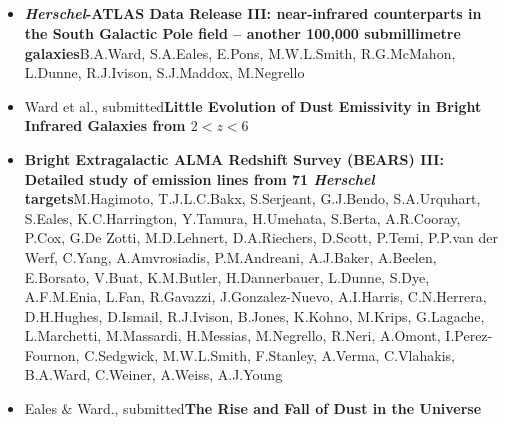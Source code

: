 \subsection*{}

\begin{itemize}
  \item[]{\citealt{Ward_2022}\newline\textbf{\textit{Herschel}-ATLAS Data Release III: near-infrared counterparts in the South Galactic Pole field -- another 100,000 submillimetre galaxies}\newline B.A.Ward, S.A.Eales, E.Pons, M.W.L.Smith, R.G.McMahon, L.Dunne, R.J.Ivison, S.J.Maddox, M.Negrello}
  
  \item[]{Ward et al., submitted}\newline\textbf{Little Evolution of Dust Emissivity in Bright Infrared Galaxies from $2 < z < 6$}
\end{itemize} 


\begin{itemize}

  \item[]{\citealt{Hagimoto_2023}\newline\textbf{Bright Extragalactic ALMA Redshift Survey (BEARS) III: Detailed study of emission lines from 71 \textit{Herschel} targets}\newline M.Hagimoto, T.J.L.C.Bakx, S.Serjeant, G.J.Bendo, S.A.Urquhart, S.Eales, K.C.Harrington, Y.Tamura, H.Umehata, S.Berta, A.R.Cooray, P.Cox, G.De Zotti, M.D.Lehnert, D.A.Riechers, D.Scott, P.Temi, P.P.van der Werf, C.Yang, A.Amvrosiadis, P.M.Andreani, A.J.Baker, A.Beelen, E.Borsato, V.Buat, K.M.Butler, H.Dannerbauer, L.Dunne, S.Dye, A.F.M.Enia, L.Fan, R.Gavazzi, J.Gonzalez-Nuevo, A.I.Harris, C.N.Herrera, D.H.Hughes, D.Ismail, R.J.Ivison, B.Jones, K.Kohno, M.Krips, G.Lagache, L.Marchetti, M.Massardi, H.Messias, M.Negrello, R.Neri, A.Omont, I.Perez-Fournon, C.Sedgwick, M.W.L.Smith, F.Stanley, A.Verma, C.Vlahakis, B.A.Ward, C.Weiner, A.Weiss, A.J.Young}
  
  \item[]{Eales \& Ward., submitted}\newline\textbf{The Rise and Fall of Dust in the Universe}
 
\end{itemize}  